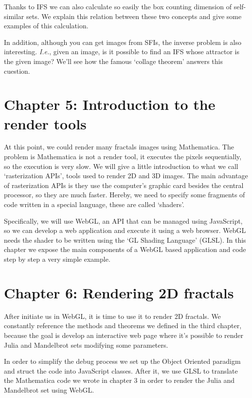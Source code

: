 Thanks to IFS we can also calculate so easily the box counting dimension of self-similar sets. We explain this relation between these two concepts and give some examples of this calculation.

In addition, although you can get images from SFIs, the inverse problem is also interesting. \textit{I.e.}, given an image, is it possible to find an IFS whose attractor is the given image? We'll see how the famous `collage theorem' answers this cuestion.

\section*{Chapter 5: Introduction to the render tools}

At this point, we could render many fractals images using Mathematica. The problem is Mathematica is not a render tool, it executes the pixels sequentially, so the execution is very slow. We will give a little introduction to what we call `rasterization APIs', tools used to render 2D and 3D images. The main advantage of rasterization APIs is they use the computer's graphic card besides the central processor, so they are much faster. Hereby, we need to specify some fragments of code written in a special language, these are called `shaders'. 

Specifically, we will use WebGL, an API that can be managed using JavaScript, so we can develop a web application and execute it using a web browser. WebGL needs the shader to be written using the `GL Shading Language' (GLSL). In this chapter we expose the main components of a WebGL based application and code step by step a very simple example.

\section*{Chapter 6: Rendering 2D fractals}

After initiate us in WebGL, it is time to use it to render 2D fractals. We constantly reference the methods and theorems we defined in the third chapter, because the goal is develop an interactive web page where it's possible to render Julia and Mandelbrot sets modifying some parameters.

In order to simplify the debug process we set up the Object Oriented paradigm and struct the code into JavaScript classes. After it, we use GLSL to translate the Mathematica code we wrote in chapter 3 in order to render the Julia and Mandelbrot set using WebGL.

